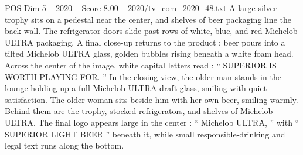 \begin{textsample}{POS Dim 5 – 2020 – Score 8.00 – 2020/tv\_com\_2020\_48.txt}
A large silver trophy sits on a pedestal near the center, and shelves of beer packaging line the back wall.
The refrigerator doors slide past rows of white, blue, and red Michelob ULTRA packaging.
A final close-up returns to the product : beer pours into a tilted Michelob ULTRA glass, golden bubbles rising beneath a white foam head.
Across the center of the image, white capital letters read : “ SUPERIOR IS WORTH PLAYING FOR. ” In the closing view, the older man stands in the lounge holding up a full Michelob ULTRA draft glass, smiling with quiet satisfaction.
The older woman sits beside him with her own beer, smiling warmly.
Behind them are the trophy, stocked refrigerators, and shelves of Michelob ULTRA.
The final logo appears large in the center : “ Michelob ULTRA, ” with “ SUPERIOR LIGHT BEER ” beneath it, while small responsible-drinking and legal text runs along the bottom.

\end{textsample}
